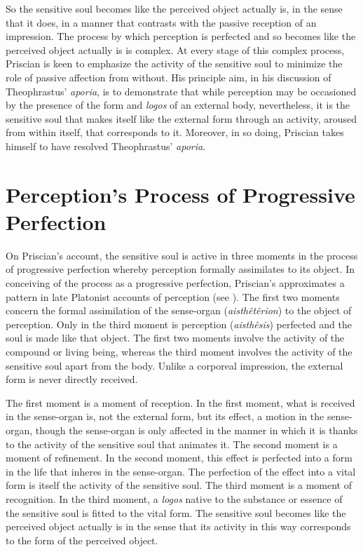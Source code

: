 \documentclass[12pt]{article}
\begin{document}
So the sensitive soul becomes like the perceived object actually is, in the sense that it does, in a manner that contrasts with the passive reception of an impression. The process by which perception is perfected and so becomes like the perceived object actually is is complex. At every stage of this complex process, Priscian is keen to emphasize the activity of the sensitive soul to minimize the role of passive affection from without. His principle aim, in his discussion of Theophrastus' \emph{aporia}, is to demonstrate that while perception may be occasioned by the presence of the form and \emph{logos} of an external body, nevertheless, it is the sensitive soul that makes itself like the external form through an activity, aroused from within itself, that corresponds to it. Moreover, in so doing, Priscian takes himself to have resolved Theophrastus' \emph{aporia}.


\section{Perception's Process of Progressive Perfection} %
\label{sec:perception_s_formal_assimilation}

On Priscian's account, the sensitive soul is active in three moments in the process of progressive perfection whereby perception formally assimilates to its object. In conceiving of the process as a progressive perfection, Priscian's approximates a pattern in late Platonist accounts of perception (see \citealt[142]{Lloyd:1990dp}). The first two moments concern the formal assimilation of the sense-organ (\emph{aisthêtêrion}) to the object of perception. Only in the third moment is perception (\emph{aisthêsis}) perfected and the soul is made like that object. The first two moments involve the activity of the compound or living being, whereas the third moment involves the activity of the sensitive soul apart from the body. Unlike a corporeal impression, the external form is never directly received. 

The first moment is a moment of reception. In the first moment, what is received in the sense-organ is, not the external form, but its effect, a motion in the sense-organ, though the sense-organ is only affected in the manner in which it is thanks to the activity of the sensitive soul that animates it. The second moment is a moment of refinement. In the second moment, this effect is perfected into a form in the life that inheres in the sense-organ. The perfection of the effect into a vital form is itself the activity of the sensitive soul. The third moment is a moment of recognition. In the third moment, a \emph{logos} native to the substance or essence of the sensitive soul is fitted to the vital form. The sensitive soul becomes like the perceived object actually is in the sense that its activity in this way corresponds to the form of the perceived object. 
\end{document}
